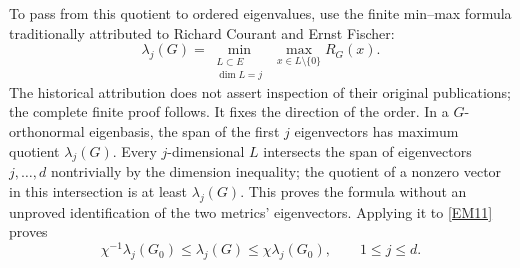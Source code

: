 \documentclass[11pt]{article}
\begin{document}
To pass from this quotient to ordered eigenvalues, use the finite min--max
formula traditionally attributed to Richard Courant and Ernst Fischer:
\[
 \lambda_j(G)=
 \min_{\substack{L\subset E\\\dim L=j}}\ 
 \max_{x\in L\setminus\{0\}} R_G(x).
\]
The historical attribution does not assert inspection of their original
publications; the complete finite proof follows. It fixes the direction of
the order. In a
\(G\)-orthonormal eigenbasis, the span of the first \(j\) eigenvectors
has maximum quotient \(\lambda_j(G)\). Every \(j\)-dimensional \(L\)
intersects the span of eigenvectors \(j,\ldots,d\) nontrivially by the
dimension inequality; the quotient of a nonzero vector in this
intersection is at least \(\lambda_j(G)\). This proves the formula
without an unproved identification of the two metrics' eigenvectors.
Applying it to \eqref{EM11} proves
\begin{equation}
 \chi^{-1}\lambda_j(G_0)\le\lambda_j(G)
          \le\chi\lambda_j(G_0),\qquad 1\le j\le d.
 \tag{EM12}\label{EM12}
\end{equation}
\end{document}
